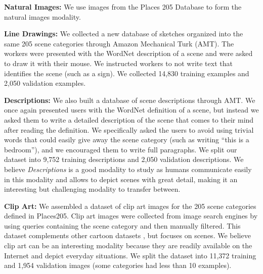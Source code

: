 \documentclass[10pt,journal,compsoc]{IEEEtran}
\begin{document}
	\textbf{Natural Images:}
	We use images from the Places 205 Database \cite{zhou2014learning} to form the natural images modality. 
	
	\textbf{Line Drawings:}
	We collected a new database of sketches organized into the same 205 scene categories through Amazon Mechanical Turk (AMT). The workers were presented with the WordNet description of a scene and were asked to draw it with their mouse. We instructed workers to not write text that identifies the scene (such as a sign). We collected 14,830 training examples and 2,050 validation examples. 
	
	
	\textbf{Descriptions:}
	We also built a database of scene descriptions through AMT. We once again presented users with the WordNet definition of a scene, but instead we asked them to write a detailed description of the scene that comes to their mind after reading the definition. We specifically asked the users to avoid using trivial words that could easily give away the scene category (such as writing ``this is a bedroom''), and we encouraged them to write full paragraphs. %
	We split our dataset into 9,752 training descriptions and 2,050 validation descriptions.
	We believe \textit{Descriptions} is a good modality to study as humans communicate easily in this modality and allows to depict scenes with great detail, making it an interesting but challenging modality to transfer between.
	
	\textbf{Clip Art:}
	We assembled a dataset of clip art images for the 205 scene categories defined in Places205. Clip art images were collected from image search engines by using queries containing the scene category and then manually filtered. This dataset complements other cartoon datasets \cite{zitnick2013bringing}, but focuses on scenes. We believe clip art can be an interesting modality because they are readily available on the Internet and depict everyday situations. We split the dataset into 11,372 training and 1,954 validation images (some categories had less than 10 examples).
	
\end{document}
